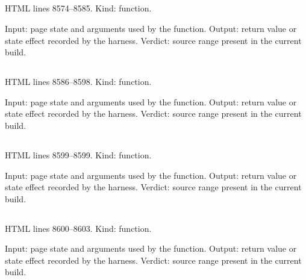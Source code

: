 \subsection*{\texttt{}}
\label{vf_466_pastedDatasetMetadata}
HTML lines 8574--8585. Kind: function.

Input: page state and arguments used by the function.
Output: return value or state effect recorded by the harness.
Verdict: source range present in the current build.

\subsection*{\texttt{}}
\label{vf_467_machineMetadataDocument}
HTML lines 8586--8598. Kind: function.

Input: page state and arguments used by the function.
Output: return value or state effect recorded by the harness.
Verdict: source range present in the current build.

\subsection*{\texttt{}}
\label{vf_468_machineMetadataJSON}
HTML lines 8599--8599. Kind: function.

Input: page state and arguments used by the function.
Output: return value or state effect recorded by the harness.
Verdict: source range present in the current build.

\subsection*{\texttt{}}
\label{vf_469_renderMachineMetadata}
HTML lines 8600--8603. Kind: function.

Input: page state and arguments used by the function.
Output: return value or state effect recorded by the harness.
Verdict: source range present in the current build.

